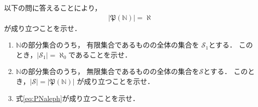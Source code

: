    \begin{que} \label{que:nyugenkasan}
     以下の問に答えることにより，
     \begin{align}
       \lvert \mathfrak{P}( \mathbb{N} ) \rvert = \aleph
       \label{eq:PNaleph}
     \end{align}
     が成り立つことを示せ．

     \begin{enumerate}[(1)]
       \item $\mathbb{N}$の部分集合のうち，
         有限集合であるものの全体の集合を
     $\mathscr{S}_1$とする．
     このとき，$\lvert \mathscr{S}_1 \rvert = \aleph_0$であることを示せ．

   \item $\mathbb{N}$の部分集合のうち，
     無限集合であるものの全体の集合を$\mathscr{S}$とする．
     このとき，$\lvert \mathscr{S} \rvert 
     = \lvert \mathfrak{P} (\mathbb{N}) \rvert$
     が成り立つことを示せ．

   \item 式\eqref{eq:PNaleph}が成り立つことを示せ．
      \end{enumerate}
 \end{que}




